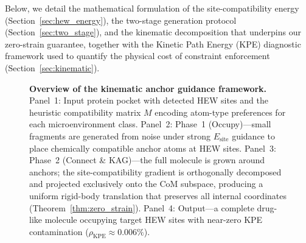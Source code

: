 \documentclass{article}
\begin{document}
Below, we detail the mathematical formulation of the site-compatibility energy
(Section~\ref{sec:hew_energy}), the two-stage generation protocol
(Section~\ref{sec:two_stage}), and the kinematic decomposition that underpins
our zero-strain guarantee, together with the Kinetic Path Energy (KPE)
diagnostic framework used to quantify the physical cost of constraint
enforcement (Section~\ref{sec:kinematic}).

\begin{figure}[H]
  \centering
  \caption{\textbf{Overview of the kinematic anchor guidance framework.}
    Panel~1: Input protein pocket with detected HEW sites and the heuristic
    compatibility matrix $M$ encoding atom-type preferences for each
    microenvironment class.
    Panel~2: Phase~1 (Occupy)---small fragments are generated from noise under
    strong $E_{\text{site}}$ guidance to place chemically compatible anchor
    atoms at HEW sites.
    Panel~3: Phase~2 (Connect \& KAG)---the full molecule is grown around
    anchors; the site-compatibility gradient is orthogonally decomposed and
    projected exclusively onto the CoM subspace, producing a uniform rigid-body
    translation that preserves all internal coordinates (Theorem~\ref{thm:zero_strain}).
    Panel~4: Output---a complete drug-like molecule occupying target HEW sites
    with near-zero KPE contamination ($\rho_{\text{KPE}} \approx 0.006\%$).}
  \label{fig:framework_overview}
\end{figure}
\end{document}
